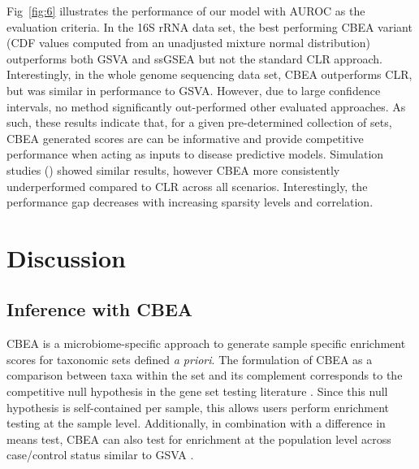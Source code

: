 Fig~\ref{fig:6} illustrates the performance of our model with AUROC as the evaluation criteria. In the 16S rRNA data set, the best performing CBEA variant (CDF values computed from an unadjusted mixture normal distribution) outperforms both GSVA and ssGSEA but not the standard CLR approach. Interestingly, in the whole genome sequencing data set, CBEA outperforms CLR, but was similar in performance to GSVA. However, due to large confidence intervals, no method significantly out-performed other evaluated approaches. As such, these results indicate that, for a given pre-determined collection of sets, CBEA generated scores are can be informative and provide competitive performance when acting as inputs to disease predictive models. Simulation studies () showed similar results, however CBEA more consistently underperformed compared to CLR across all scenarios. Interestingly, the performance gap decreases with increasing sparsity levels and correlation. 

\section{Discussion}

\subsection{Inference with CBEA} 
CBEA is a microbiome-specific approach to generate sample specific enrichment scores for taxonomic sets defined \emph{a priori}. The formulation of CBEA as a comparison between taxa within the set and its complement corresponds to the competitive null hypothesis in the gene set testing literature \cite{tian2005}. Since this null hypothesis is self-contained per sample, this allows users perform enrichment testing at the sample level. Additionally, in combination with a difference in means test, CBEA can also test for enrichment at the population level across case/control status similar to GSVA \cite{hanzelmann2013}.  

